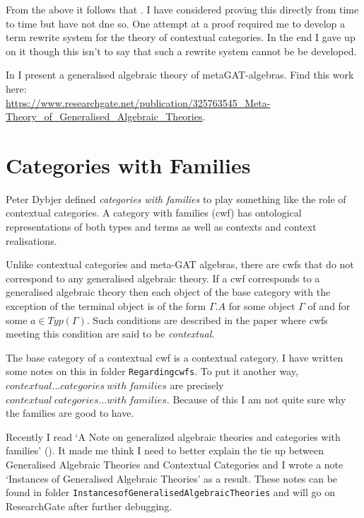 \documentclass[10pt,a4paper]{article}
\theoremstyle{remark}
\newcommand{\myurl}[1]{{\footnotesize \url{#1}}}
\begin{document}
\note
From the above it follows that 
. 
I have considered proving this directly from time to time but have not dne so.
\note
One attempt at a proof required me to develop a  term rewrite system for the theory of contextual categories. In the end I gave up on it though this isn't to say that such a rewrite system cannot be be developed.

\note 
In \cite{CartmellMetaTheory} I present a generalised algebraic theory of metaGAT-algebras.
Find this work here:\\
\myurl{https://www.researchgate.net/publication/325763545_Meta-Theory_of_Generalised_Algebraic_Theories}.

\section{Categories with Families}
\note Peter Dybjer defined \textit{categories with families}  to play something like the role of contextual categories. 
A category with families (cwf) has  ontological representations of both types and terms as well as contexts and context realisations. 

\note
Unlike contextual categories and meta-GAT algebras, there are cwfs that do not correspond to
any generalised algebraic theory. If a cwf corresponds to a generalised algebraic theory then each object of the base category \catcw with the exception of the terminal object is of the form $\Gamma.A$ for some object $\Gamma$ of \catcw and for some $a \in Typ(\Gamma)$. Such conditions are described in the paper \cite{??}
where cwfs meeting this condition are said to be \textit{contextual}.

\note The base category of a  contextual cwf is a contextual category. I have written some notes on this in folder \verb!Regardingcwfs!. 
To put it another way, $contextual ... categories\  with\  families$ are precisely $contextual\ categories...with\ families$. Because of this
I am not quite sure why the families are good to have. 

\note Recently I read  `A Note on generalized algebraic theories and categories with families' (\cite{BCDEpaper}). It made me think I need to better explain the tie up between 
Generalised Algebraic Theories and Contextual Categories and I wrote a note `Instances of Generalised Algebraic Theories' as a result.
These notes can be found in folder \verb!InstancesofGeneralisedAlgebraicTheories! and will go on ResearchGate after further debugging.
\end{document}
